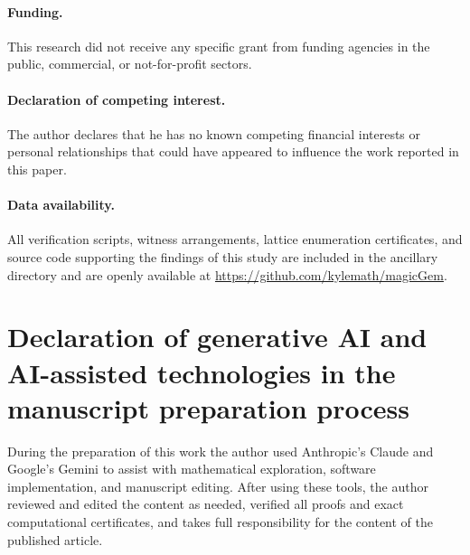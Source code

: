 \paragraph{Funding.} This research did not receive any specific grant from funding agencies in the public, commercial, or not-for-profit sectors.

\paragraph{Declaration of competing interest.} The author declares that he has no known competing financial interests or personal relationships that could have appeared to influence the work reported in this paper.

\paragraph{Data availability.} All verification scripts, witness arrangements, lattice enumeration certificates, and source code supporting the findings of this study are included in the ancillary directory and are openly available at \url{https://github.com/kylemath/magicGem}.

\section*{Declaration of generative AI and AI-assisted technologies in the manuscript preparation process}
\label{sec:ai_statement}
During the preparation of this work the author used Anthropic's Claude and Google's Gemini to assist with mathematical exploration, software implementation, and manuscript editing. After using these tools, the author reviewed and edited the content as needed, verified all proofs and exact computational certificates, and takes full responsibility for the content of the published article.

